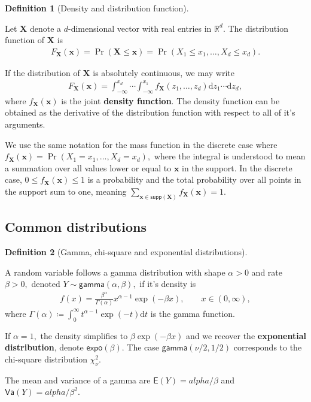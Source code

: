 \documentclass[
  11pt,
  letterpaper,
]{scrbook}
\theoremstyle{definition}
\newtheorem{definition}{Definition}[chapter]
\theoremstyle{plain}
\theoremstyle{plain}
\theoremstyle{definition}
\theoremstyle{definition}
\theoremstyle{remark}
\begin{document}
\begin{definition}[Density and distribution
function]\protect\hypertarget{def-cdf}{}\label{def-cdf}

Let \(\boldsymbol{X}\) denote a \(d\)-dimensional vector with real
entries in \(\mathbb{R}^d.\) The distribution function of
\(\boldsymbol{X}\) is \begin{align*}
 F_{\boldsymbol{X}}(\boldsymbol{x}) = \Pr(\boldsymbol{X} \leq \boldsymbol{x}) = \Pr(X_1 \leq x_1, \ldots, X_d \leq x_d).
\end{align*}

If the distribution of \(\boldsymbol{X}\) is absolutely continuous, we
may write \begin{align*}
 F_{\boldsymbol{X}}(\boldsymbol{x}) = \int_{-\infty}^{x_d} \cdots \int_{-\infty}^{x_1} f_{\boldsymbol{X}}(z_1, \ldots, z_d) \mathrm{d} z_1 \cdots \mathrm{d} z_d,
\end{align*} where \(f_{\boldsymbol{X}}(\boldsymbol{x})\) is the joint
\textbf{density function}. The density function can be obtained as the
derivative of the distribution function with respect to all of it's
arguments.

We use the same notation for the mass function in the discrete case
where
\(f_{\boldsymbol{X}}(\boldsymbol{x}) = \Pr(X_1 = x_1, \ldots, X_d = x_d),\)
where the integral is understood to mean a summation over all values
lower or equal to \(\boldsymbol{x}\) in the support. In the discrete
case, \(0 \leq f_{\boldsymbol{X}}(\boldsymbol{x}) \leq 1\) is a
probability and the total probability over all points in the support sum
to one, meaning
\(\sum_{\boldsymbol{x} \in \mathsf{supp}(\boldsymbol{X})} f_{\boldsymbol{X}}(\boldsymbol{x}) = 1.\)

\end{definition}

\subsection{Common distributions}\label{common-distributions}

\begin{definition}[Gamma, chi-square and exponential
distributions]\protect\hypertarget{def-gamma}{}\label{def-gamma}

A random variable follows a gamma distribution with shape \(\alpha>0\)
and rate \(\beta>0,\) denoted \(Y \sim \mathsf{gamma}(\alpha, \beta),\)
if it's density is \begin{align*}
f(x) = \frac{\beta^\alpha}{\Gamma(\alpha)}x^{\alpha-1}\exp(-\beta x), \qquad x \in (0, \infty),
\end{align*} where
\(\Gamma(\alpha)\coloneqq\int_0^\infty t^{\alpha-1}\exp(-t)\mathrm{d} t\)
is the gamma function.

If \(\alpha=1,\) the density simplifies to \(\beta \exp(-\beta x)\) and
we recover the \textbf{exponential distribution}, denote
\(\mathsf{expo}(\beta).\) The case \(\mathsf{gamma}(\nu/2, 1/2)\)
corresponds to the chi-square distribution \(\chi^2_\nu.\)

The mean and variance of a gamma are \(\mathsf{E}(Y)=alpha/\beta\) and
\(\mathsf{Va}(Y)=alpha/\beta^2\).

\end{definition}
\end{document}
